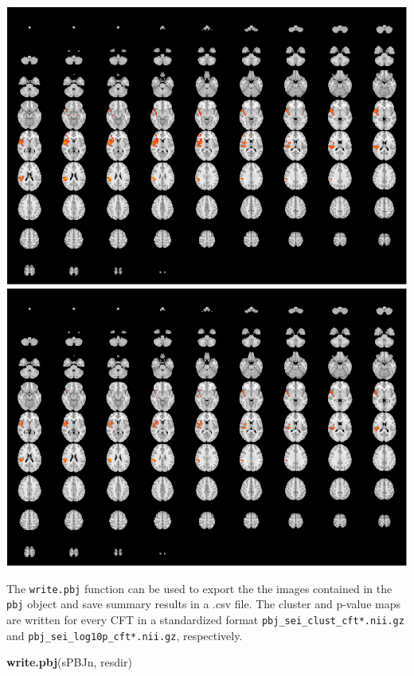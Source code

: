\documentclass[]{article}
\newenvironment{Shaded}{\begin{snugshade}}{\end{snugshade}}
\newcommand{\KeywordTok}[1]{\textcolor[rgb]{0.13,0.29,0.53}{\textbf{#1}}}
\newcommand{\NormalTok}[1]{#1}
\begin{document}
\includegraphics{introduction_to_pbj_files/figure-latex/unnamed-chunk-12-1.pdf}
\includegraphics{introduction_to_pbj_files/figure-latex/unnamed-chunk-12-2.pdf}

The \texttt{write.pbj} function can be used to export the the images
contained in the \texttt{pbj} object and save summary results in a .csv
file. The cluster and p-value maps are written for every CFT in a
standardized format \texttt{pbj\_sei\_clust\_cft*.nii.gz} and
\texttt{pbj\_sei\_log10p\_cft*.nii.gz}, respectively.

\begin{Shaded}
\begin{Highlighting}[]
\KeywordTok{write.pbj}\NormalTok{(sPBJn, resdir)}
\end{Highlighting}
\end{Shaded}
\end{document}
